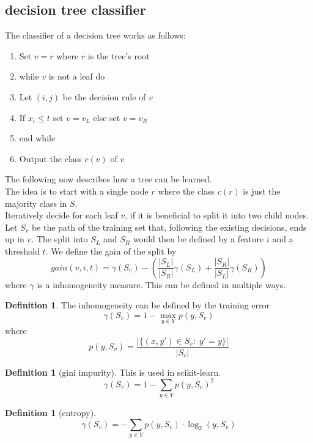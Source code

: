\documentclass[a4paper, 12pt]{article}
\theoremstyle{plain}
\theoremstyle{definition}
\newtheorem{definition}[theorem]{Definition} %
\theoremstyle{lemma}
\theoremstyle{remark}
\theoremstyle{example}
\begin{document}
	\subsection{decision tree classifier}
	The classifier of a decision tree works as follows: \begin{enumerate}
		\item Set $v = r$ where $r$ is the tree's root
		\item while $v$ is not a leaf do
		\item Let $(i,j)$ be the decision rule of $v$
		\item If $x_i \leq t$ set $v = v_L$ else set $v = v_R$
		\item end while
		\item Output the class $c(v)$ of $v$
	\end{enumerate}
	The following now describes how a tree can be learned.\\
	The idea is to start with a single node $r$ where the class $c(r)$ is just the majority class in $S$.\\
	Iteratively decide for each leaf $v$, if it is beneficial to split it into two child nodes. Let $S_v$ be the path of the training set that, following the existing decisions, ends up in $v$. The split into $S_L$ and $S_R$ would then be defined by a feature $i$ and a threshold $t$. We define the gain of the split by \[gain(v,i,t) = \gamma(S_v) - \left(\frac{\left|S_L\right|}{\left|S_R\right|}\gamma(S_L) + \frac{\left|S_R\right|}{\left|S_L\right|}\gamma(S_R)\right)\] where $\gamma$ is a inhomogeneity measure. This can be defined in multiple ways.
	\begin{definition}
		The inhomogeneity can be defined by the training error \[\gamma(S_v) = 1- \max\limits_{y \in Y} p(y,S_v)\] where \[p(y,S_v) = \frac{\left|\{(x,y') \in S_v: \; y' = y\}\right|}{\left|S_v\right|}\]
	\end{definition}
	\begin{definition}[gini impurity]
		This is used in scikit-learn. \[\gamma(S_v) = 1- \sum_{y \in Y} p(y, S_v)^2\]
	\end{definition}
	\begin{definition}[entropy]
		\[\gamma(S_v) = -\sum_{y \in Y} p(y,S_v)\cdot\log_2(y,S_v)\]
	\end{definition}
\end{document}

